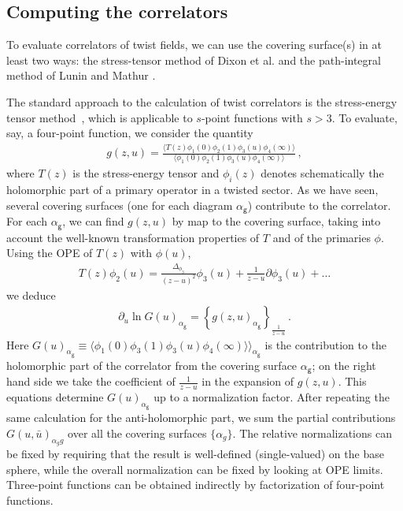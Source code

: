 \documentclass[letterpaper]{JHEP3}
\def\d{\partial}
\def\be{\begin{equation}}
\def\ee{\end{equation}}
\def\d{{\partial}}
\def\be{\begin{eqnarray}}
\def\ee{\end{eqnarray}}
\def\d{\partial}
\def\gg{\mathsf g }
\begin{document}
\subsection{Computing the correlators}



To evaluate correlators of twist fields, we can use the covering surface(s) in at least two  ways: the stress-tensor
method of Dixon et al. \cite{Dixon:1986qv} and the path-integral method of Lunin and Mathur \cite{Lunin:2000yv}.

The standard approach to the calculation of twist correlators is the stress-energy tensor method~\cite{Dixon:1986qv},
which is  applicable to $s$-point functions with $s>3$.  To evaluate, say, a four-point function, we consider
 the quantity
\be
g(z,u)=\frac{\langle T(z)\phi_1(0)\phi_2(1)\phi_3(u)\phi_4(\infty) \rangle}{\langle \phi_1(0)\phi_2(1)\phi_3(u)\phi_4(\infty) \rangle} \, ,
\ee 
where $T(z)$ is the stress-energy tensor and $\phi_i(z)$ denotes schematically the holomorphic part of a  primary operator in a twisted sector.
 As we have seen, several covering surfaces (one for each diagram $\alpha_\gg$) contribute to the correlator.
For each $\alpha_\gg$, we can find  $g(z,u)$ by map to the covering surface, taking into account the well-known
transformation properties of $T$ and of the primaries $\phi$. 
Using
the OPE of $T(z)$ with
$\phi(u)$,
\be
T(z)\phi_2(u)=\frac{\Delta_{\phi_3}}{(z-u)^2}\phi_3(u)+\frac{1}{z-u}\d \phi_3(u)+\dots 
\ee 
 we deduce
\be
\d_u \ln G(u)_{\alpha_\gg}=\left\{g(z,u)_{\alpha_\gg  }\right\}_{\frac{1}{z-u}} \,.
\ee 
Here  $G(u)_{\alpha_\gg} \equiv \langle   \phi_1(0)  \phi_3(1) \phi_3(u)\phi_4(\infty) \rangle \rangle_{\alpha_\gg}$ 
is the contribution to the holomorphic part of the correlator from the covering surface $\alpha_\gg$;
 on the right hand side we take the coefficient of
$\frac{1}{z-u}$ in the expansion of $g(z,u)$. This equations determine $G(u)_{\alpha_\gg}$
up to a normalization factor.   After repeating the same calculation for the anti-holomorphic part,  we sum the partial
contributions $G(u, \bar u)_{\alpha_gg}$ over all the covering surfaces $\{ \alpha_g \}$. The relative normalizations
can be fixed by requiring that the result is well-defined (single-valued) on the base sphere,
while the overall normalization can be fixed by looking at OPE limits. Three-point functions can be obtained indirectly by factorization of four-point functions.
\end{document}
